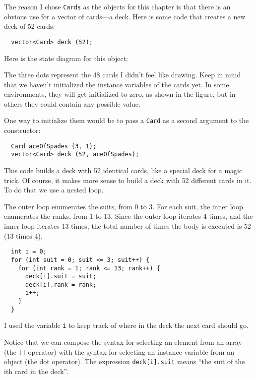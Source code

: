 The reason I chose {\tt Cards} as the objects for this chapter is that
there is an obvious use for a vector of cards---a deck.  Here is some
code that creates a new deck of 52 cards:

\begin{verbatim}
  vector<Card> deck (52);
\end{verbatim}
%
Here is the state diagram for this object:


\vspace{0.1in}
\centerline{}
\vspace{0.1in}

The three dots represent the 48 cards I didn't feel like
drawing.  Keep in mind that we haven't initialized the instance
variables of the cards yet.  In some environments, they will get
initialized to zero, as shown in the figure, but in others they
could contain any possible value.

One way to initialize them would be to pass a {\tt Card} as
a second argument to the constructor:

\begin{verbatim}
  Card aceOfSpades (3, 1);
  vector<Card> deck (52, aceOfSpades);
\end{verbatim}
%
This code builds a deck with 52 identical cards, like
a special deck for a magic trick.  Of course,
it makes more sense to build a deck with 52 different cards
in it.  To do that we use a nested loop.


The outer loop enumerates the suits, from 0 to 3.  For
each suit, the inner loop enumerates the ranks, from 1
to 13.  Since the outer loop iterates 4 times, and
the inner loop iterates 13 times, the total number of times
the body is executed is 52 (13 times 4).

\begin{verbatim}
  int i = 0;
  for (int suit = 0; suit <= 3; suit++) {
    for (int rank = 1; rank <= 13; rank++) {
      deck[i].suit = suit;
      deck[i].rank = rank;
      i++;
    }
  }
\end{verbatim}
%
I used the variable {\tt i} to keep track of where in the
deck the next card should go.


Notice that we can compose the syntax for selecting an element
from an array (the {\tt []} operator) with the syntax for
selecting an instance variable from an object (the dot
operator).  The expression {\tt deck[i].suit} means 
``the suit of the ith card in the deck''.

